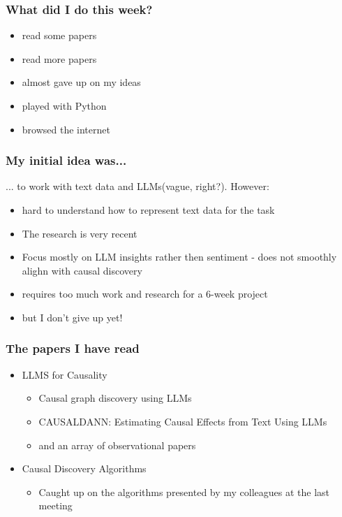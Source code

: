\documentclass[t,24pt,aspectratio=169]{beamer}
\begin{document}
\begin{frame}[hoved]
\frametitle{What did I do this week?}
\begin{itemize}
    \item read some papers
    \item read more papers
    \item almost gave up on my ideas
    \item played with Python
    \item browsed the internet
\end{itemize}
\end{frame}

\begin{frame}[hoved]
\frametitle{My initial idea was...}
... to work with text data and LLMs(vague, right?). However:
\begin{itemize}
    \item hard to understand how to represent text data for the task
    \item The research is very recent
    \item Focus mostly on LLM insights rather then sentiment - does not smoothly alighn with causal discovery
    \item requires too much work and research for a 6-week project
    \item but I don't give up yet!
\end{itemize}
\end{frame}

\begin{frame}[hoved]
\frametitle{The papers I have read}
\begin{itemize}
    \item LLMS for Causality
    \begin{itemize}
        \item Causal graph discovery using LLMs \cite{jiralerspong2024efficientcausalgraphdiscovery}
        \item CAUSALDANN: Estimating Causal Effects from Text Using LLMs 
        \cite{guo2025estimatingcausaleffectstext}
        \item and an array of observational papers
    \end{itemize}
    \item Causal Discovery Algorithms
    \begin{itemize}
        \item Caught up on the algorithms presented by my colleagues at the last meeting
    \end{itemize}
\end{itemize}
\end{frame}
\end{document}
